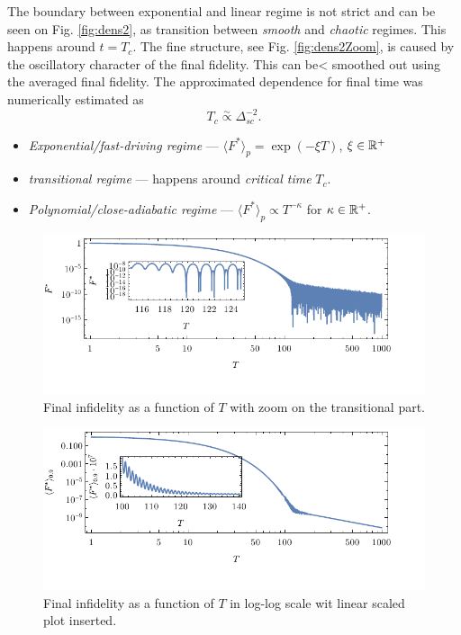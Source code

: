 The boundary between exponential and linear regime is not strict and can be seen on Fig. \ref{fig:dens2}, as transition between \emph{smooth} and \emph{chaotic} regimes. This happens around $t=T_c$. The fine structure, see Fig. \ref{fig:dens2Zoom}, is caused by the oscillatory character of the final fidelity. This can be< smoothed out using the averaged final fidelity. The approximated dependence for final time was numerically estimated as
\begin{equation}
    T_c\overset{\sim}{\propto} \Delta_{sc}^{-2}.
\end{equation}


\begin{itemize}
    \item \emph{Exponential/fast-driving regime} — $\langle F^*\rangle_p= \exp(-\xi T)$, $\xi\in\mathbb{R}^+$
    \item \emph{transitional regime} — happens around \emph{critical time} $T_c$.
    \item \emph{Polynomial/close-adiabatic regime} — $\langle F^*\rangle_p\propto T^{-\kappa}$ for $\kappa\in \mathbb{R}^+$.
\end{itemize}

\begin{figure}[h]
    \centering
    \includegraphics[scale=1.2]{../img/infidelityTfPlotLogLinCombined1.pdf}
    \caption{Final infidelity as a function of $T$ with zoom on the transitional part.}
    \label{fig:infidelityTfPlotLogLinCombined}
\end{figure}
\begin{figure}[h]
    \centering
    \includegraphics[scale=1.2]{../img/infidCombined1.pdf}
    \caption{Final infidelity as a function of $T$ in log-log scale wit linear scaled plot inserted.}
    \label{fig:infidCombined}
\end{figure}




